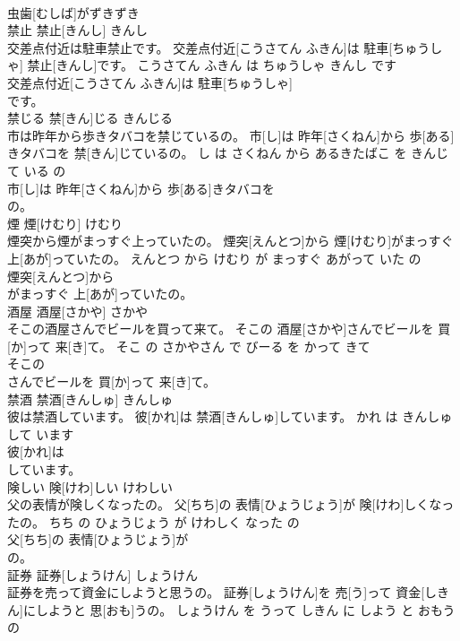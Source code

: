 \documentclass[8pt]{extreport}
\begin{document}
\begin{CJK}{UTF8}{min}
\\	虫歯[むしば]がずきずき
\\	禁止	禁止[きんし]	きんし	
\\	交差点付近は駐車禁止です。	交差点付近[こうさてん ふきん]は 駐車[ちゅうしゃ] 禁止[きんし]です。	こうさてん ふきん は ちゅうしゃ きんし です	
\\	交差点付近[こうさてん ふきん]は 駐車[ちゅうしゃ]
\\	です。			
\\	禁じる	禁[きん]じる	きんじる	
\\	市は昨年から歩きタバコを禁じているの。	市[し]は 昨年[さくねん]から 歩[ある]きタバコを 禁[きん]じているの。	し は さくねん から あるきたばこ を きんじて いる の	
\\	市[し]は 昨年[さくねん]から 歩[ある]きタバコを
\\	の。			
\\	煙	煙[けむり]	けむり	
\\	煙突から煙がまっすぐ上っていたの。	煙突[えんとつ]から 煙[けむり]がまっすぐ 上[あが]っていたの。	えんとつ から けむり が まっすぐ あがって いた の	
\\	煙突[えんとつ]から
\\	がまっすぐ 上[あが]っていたの。			
\\	酒屋	酒屋[さかや]	さかや	
\\	そこの酒屋さんでビールを買って来て。	そこの 酒屋[さかや]さんでビールを 買[か]って 来[き]て。	そこ の さかやさん で びーる を かって きて	
\\	そこの
\\	さんでビールを 買[か]って 来[き]て。			
\\	禁酒	禁酒[きんしゅ]	きんしゅ	
\\	彼は禁酒しています。	彼[かれ]は 禁酒[きんしゅ]しています。	かれ は きんしゅ して います	
\\	彼[かれ]は
\\	しています。			
\\	険しい	険[けわ]しい	けわしい	
\\	父の表情が険しくなったの。	父[ちち]の 表情[ひょうじょう]が 険[けわ]しくなったの。	ちち の ひょうじょう が けわしく なった の	
\\	父[ちち]の 表情[ひょうじょう]が
\\	の。			
\\	証券	証券[しょうけん]	しょうけん	
\\	証券を売って資金にしようと思うの。	証券[しょうけん]を 売[う]って 資金[しきん]にしようと 思[おも]うの。	しょうけん を うって しきん に しよう と おもう の	

\end{CJK}
\end{document}
